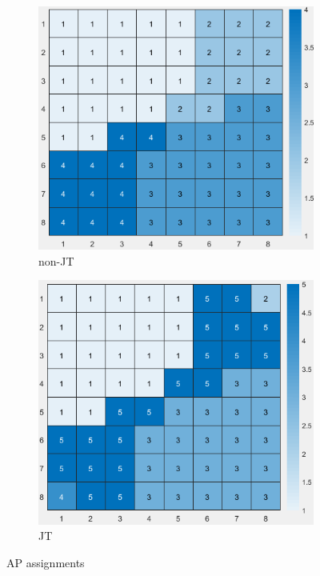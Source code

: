 \begin{figure}[h]
	\centering
	\begin{subfigure}[t]{0.4\linewidth}
		\includegraphics[width=\linewidth]{non-JT_scenario.PNG}
		\caption{non-JT \label{fig:non-JT}} %
        
	\end{subfigure}
	\begin{subfigure}[t]{0.4\linewidth}
		\includegraphics[width=\linewidth]{JT_scenario.PNG}
		\caption{JT \label{fig:JT}} %
       
	\end{subfigure}
	\caption[AP assignments]{AP assignments}
	\label{fig:ap_assignment}
\end{figure}

